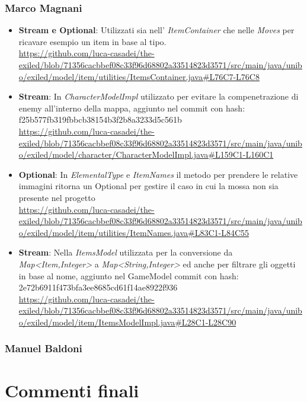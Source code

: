 \documentclass[a4paper,12pt]{report}
\begin{document}
\subsection{Marco Magnani}
\begin{itemize}
	\item \textbf{Stream e Optional}: Utilizzati sia nell' \textit{ItemContainer} che nelle \textit{Moves} per ricavare esempio un item in base al tipo.\\ \url{https://github.com/luca-casadei/the-exiled/blob/71356cacbbef08c33f96d68802a33514823d3571/src/main/java/unibo/exiled/model/item/utilities/ItemsContainer.java#L76C7-L76C8}
	\item \textbf{Stream}: In \textit{CharacterModelImpl} utilizzato per evitare la compenetrazione di enemy all'interno della mappa, aggiunto nel commit con hash: f25b577fb319fbbcb38154b3f2b8a3233d5c561b\\
	\url{https://github.com/luca-casadei/the-exiled/blob/71356cacbbef08c33f96d68802a33514823d3571/src/main/java/unibo/exiled/model/character/CharacterModelImpl.java#L159C1-L160C1} 
	\item \textbf{Optional}: In \textit{ElementalType} e \textit{ItemNames} il metodo per prendere le relative immagini ritorna un Optional per gestire il caso in cui la mossa non sia presente nel progetto\\
	\url{https://github.com/luca-casadei/the-exiled/blob/71356cacbbef08c33f96d68802a33514823d3571/src/main/java/unibo/exiled/model/item/utilities/ItemNames.java#L83C1-L84C55}
	\item \textbf{Stream}: Nella \textit{ItemsModel} utilizzata per la conversione da \textit{Map\textless Item,Integer\textgreater} a \textit{Map\textless String,Integer\textgreater} ed anche per filtrare gli oggetti in base al nome, aggiunto nel GameModel commit con hash: 2e72b6911f473bfa3ee8685cd61f14ae8922f936\\
	\url{https://github.com/luca-casadei/the-exiled/blob/71356cacbbef08c33f96d68802a33514823d3571/src/main/java/unibo/exiled/model/item/ItemsModelImpl.java#L28C1-L28C90}
\end{itemize}


\subsection{Manuel Baldoni}

\chapter{Commenti finali}
\end{document}
